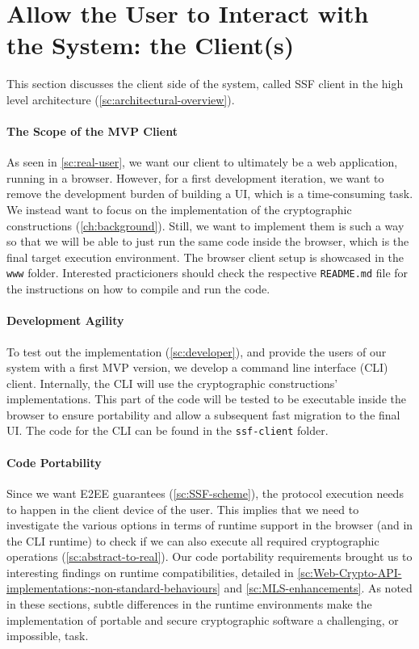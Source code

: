 \section{Allow the User to Interact with the System: the Client(s)}\label{sc:client-overview}

This section discusses the client side of the system,
called SSF client in the high level architecture (\cref{sc:architectural-overview}).

\paragraph{The Scope of the MVP Client}
As seen in \cref{sc:real-user}, 
we want our client to ultimately be a web application,
running in a browser.
However, for a first development iteration, we want to
remove the development burden of building a UI, which is
a time-consuming task. We instead want to focus on the
implementation of the cryptographic constructions (\cref{ch:background}). 
Still, we want to implement them is such a way so that we
will be able to just run the same code inside the browser,
which is the final target execution environment.
The browser client setup is showcased
in the \texttt{www} folder. Interested practicioners
should check the respective \texttt{README.md} file
for the instructions on how to compile and run the code.

\paragraph{Development Agility} 
To test out the implementation (\cref{sc:developer}), 
and provide the users of our system
with a first MVP version, we develop a
command line interface (CLI) client.
Internally, the CLI will use the cryptographic constructions'
implementations. This part of the code will be tested to be executable
inside the browser to ensure portability and allow a subsequent fast
migration to the final UI. The code for the CLI
can be found in the \texttt{ssf-client} folder.

\paragraph{Code Portability}
Since we want E2EE guarantees (\cref{sc:SSF-scheme}), the protocol execution needs to happen
in the client device of the user.
This implies that we need to investigate the various options
in terms of runtime support in the browser (and in the CLI runtime) 
to check if we can also execute all required cryptographic 
operations (\cref{sc:abstract-to-real}).
Our code portability requirements brought us to interesting
findings on runtime compatibilities,
detailed in \cref{sc:Web-Crypto-API-implementations:-non-standard-behaviours}
and \cref{sc:MLS-enhancements}. As noted in these sections,
subtle differences in the runtime environments
make the implementation of portable and secure 
cryptographic software a challenging, or impossible, 
task.

